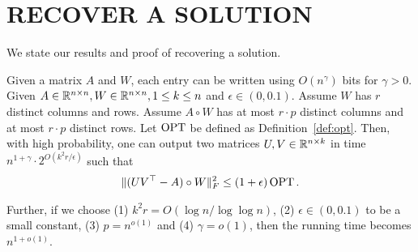 \section{RECOVER A SOLUTION}\label{sec:recover_solution}

We state our results and proof of recovering a solution.
\begin{theorem}\label{thm:recover_solution}
Given a matrix $A$ and $W$, each entry can be written using $O(n^{\gamma})$ bits for $\gamma >0$.
Given $A \in \mathbb{R}^{n \times n}, W \in \mathbb{R}^{n \times n}, 1 \leq k \leq n$ and $ \epsilon \in (0,0.1)$. 
Assume $W$ has $r$ distinct columns and rows. 
Assume $A \circ W$ has at most $r \cdot p$ distinct columns and at most $r \cdot p$ distinct rows. 
Let $\operatorname{OPT}$ be defined as Definition~\ref{def:opt}. 
Then, with high probability,  
one can output two matrices $U,V \in \mathbb{R}^{n \times k}$ in time $n^{1+\gamma} \cdot 2^{O (k^2 r / \epsilon )} $ such that 
\begin{align*}
    \| (UV^\top- A) \circ W \|_F^2 \leq(1+\epsilon) \operatorname{OPT} .
\end{align*}

Further, if we choose (1) $k^2 r = O(\log n /\log\log n)$, (2) $\epsilon \in (0,0.1)$ to be a small constant, (3) $p = n^{o(1)}$ and (4) $\gamma = o(1)$, then the running time becomes $n^{1+o(1)}$.
\end{theorem}



